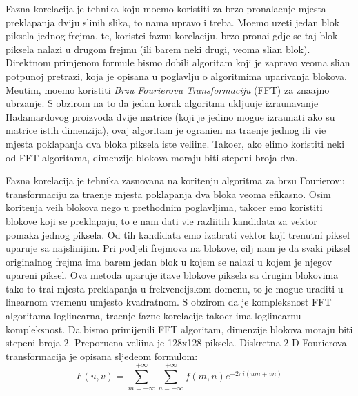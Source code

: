 Fazna korelacija je tehnika koju mo\zh emo koristiti za brzo pronala\zh enje mjesta preklapanja dviju sli\ch nih slika, \sh to nama upravo i treba. Mo\zh emo uzeti jedan blok piksela jednog frejma, te, koriste\cj i faznu korelaciju, brzo prona\cj i
gdje se taj blok piksela nalazi u drugom frejmu (ili barem neki drugi, veoma sli\ch an blok). Direktnom primjenom formule bismo dobili algoritam koji je zapravo veoma sli\ch an potpunoj pretrazi, koja je opisana u poglavlju o algoritmima
uparivanja blokova. Me\dj utim, mo\zh emo koristiti \textit{Brzu Fourierovu Transformaciju} (FFT) za zna\ch ajno ubrzanje. S obzirom na to da jedan korak algoritma uklju\ch uje izra\ch unavanje Hadamardovog proizvoda dvije matrice
(koji je jedino mogu\cj e izra\ch unati ako su matrice istih dimenzija), ovaj algoritam je ograni\ch en na tra\zh enje jednog ili vi\sh e mjesta poklapanja dva bloka piksela iste veli\ch ine. Tako\dj er, ako \zh elimo koristiti neki od FFT algoritama,
dimenzije blokova moraju biti stepeni broja dva.

Fazna korelacija je tehnika zasnovana na kori\sh tenju algoritma za brzu Fourierovu transformaciju za tra\zh enje mjesta poklapanja dva bloka veoma efikasno. Osim kori\sh tenja ve\cj ih blokova nego u prethodnim poglavljima,
tako\dj er \cj emo koristiti blokove koji se preklapaju, \sh to \cj e nam dati vi\sh e razli\ch itih kandidata za vektor pomaka jednog piksela. Od tih kandidata \cj emo izabrati vektor koji trenutni piksel uparuje sa najsli\ch nijim.
Pri podjeli frejmova na blokove, cilj nam je da svaki piksel originalnog frejma ima barem jedan blok u kojem se nalazi u kojem je njegov upareni piksel.
Ova metoda uparuje \ch itave blokove piksela sa drugim blokovima tako \sh to tra\zh i mjesta preklapanja u frekvencijskom domenu, \sh to je mogu\cj e uraditi u linearnom vremenu umjesto kvadratnom. S obzirom da je kompleksnost
FFT algoritama loglinearna, tra\zh enje fazne korelacije tako\dj er ima loglinearnu kompleksnost. Da bismo primijenili FFT algoritam, dimenzije blokova moraju biti stepeni broja 2. Preporu\ch ena veli\ch ina je 128x128 piksela.
Diskretna 2-D Fourierova transformacija je opisana sljede\cj om formulom:
\[ %
F(u,v)=\sum_{m=-\infty}^{+\infty}\sum_{n=-\infty}^{+\infty}f(m,n)e^{-2\pi i(um+vn)}
\]

